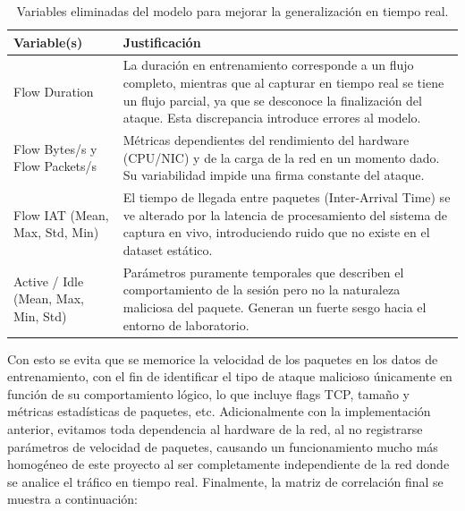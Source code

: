 \documentclass[12pt]{article}
\numberwithin{equation}{section} %
\begin{document}
    \begin{table}[H]
        \centering
        \renewcommand{\arraystretch}{1.5}
        \begin{tabular}{|>{\centering\arraybackslash}m{4cm}|>{\centering\arraybackslash}m{10cm}|}
            \hline            
            \textbf{Variable(s)} & \textbf{Justificación} \\ \hline
            Flow Duration & La duración en entrenamiento corresponde a un flujo completo, mientras que al capturar en tiempo real se tiene un flujo parcial, ya que se desconoce la finalización del ataque. Esta discrepancia introduce errores al modelo. \\ \hline
            Flow Bytes/s y Flow Packets/s & Métricas dependientes del rendimiento del hardware (CPU/NIC) y de la carga de la red en un momento dado. Su variabilidad impide una firma constante del ataque. \\ \hline
            Flow IAT (Mean, Max, Std, Min) & El tiempo de llegada entre paquetes (Inter-Arrival Time) se ve alterado por la latencia de procesamiento del sistema de captura en vivo, introduciendo ruido que no existe en el dataset estático. \\ \hline
            Active / Idle (Mean, Max, Min, Std) & Parámetros puramente temporales que describen el comportamiento de la sesión pero no la naturaleza maliciosa del paquete. Generan un fuerte sesgo hacia el entorno de laboratorio. \\ \hline
        \end{tabular}
        \caption{Variables eliminadas del modelo para mejorar la generalización en tiempo real.}
        \label{tab: variables_eliminadas}
    \end{table}

    \vspace{5mm}

    Con esto se evita que se memorice la velocidad de los paquetes en los datos de entrenamiento, con el fin de identificar el tipo de ataque malicioso únicamente en función de su comportamiento lógico, lo que incluye flags TCP, tamaño y métricas estadísticas de paquetes, etc. Adicionalmente con la implementación anterior, evitamos toda dependencia al hardware de la red, al no registrarse parámetros de velocidad de paquetes, causando un funcionamiento mucho más homogéneo de este proyecto al ser completamente independiente de la red donde se analice el tráfico en tiempo real. Finalmente, la matriz de correlación final se muestra a continuación: 
    
\end{document}
